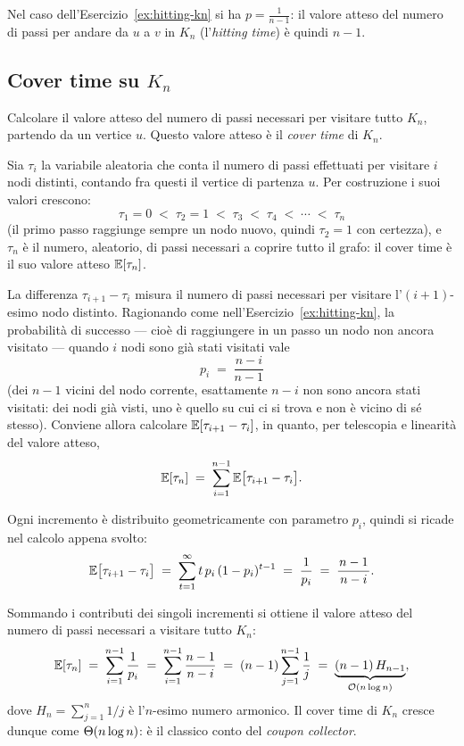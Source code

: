 Nel caso dell'Esercizio~\ref{ex:hitting-kn} si ha $p=\frac{1}{n-1}$: il valore atteso del numero di
passi per andare da $u$ a $v$ in $K_n$ (l'\emph{hitting time}) è quindi $n-1$.

\subsection{Cover time su \texorpdfstring{$K_n$}{Kn}}

\begin{esercizio}\label{ex:cover-kn}
Calcolare il valore atteso del numero di passi necessari per visitare tutto $K_n$, partendo da
un vertice $u$. Questo valore atteso è il \emph{cover time} di $K_n$.
\end{esercizio}

Sia $\tau_i$ la variabile aleatoria che conta il numero di passi effettuati per visitare $i$
nodi distinti, contando fra questi il vertice di partenza $u$. Per costruzione i suoi valori
crescono:
\[
  \tau_1 = 0 \;<\; \tau_2 = 1 \;<\; \tau_3 \;<\; \tau_4 \;<\; \cdots \;<\; \tau_n
\]
(il primo passo raggiunge sempre un nodo nuovo, quindi $\tau_2 = 1$ con certezza), e
$\tau_n$ è il numero, aleatorio, di passi necessari a coprire tutto il grafo: il cover time è
il suo valore atteso $\mathbb{E}[\tau_n]$.

La differenza $\tau_{i+1}-\tau_i$ misura il numero di passi necessari per visitare
l'$(i+1)$-esimo nodo distinto. Ragionando come nell'Esercizio~\ref{ex:hitting-kn}, la probabilità di
successo --- cioè di raggiungere in un passo un nodo non ancora visitato --- quando $i$ nodi
sono già stati visitati vale
\[
  p_i \;=\; \frac{n-i}{n-1}
\]
(dei $n-1$ vicini del nodo corrente, esattamente $n-i$ non sono ancora stati visitati: dei
nodi già visti, uno è quello su cui ci si trova e non è vicino di sé stesso). Conviene allora
calcolare $\mathbb{E}[\tau_{i+1}-\tau_i]$, in quanto, per telescopia e linearità del valore atteso,
\[
  \mathbb{E}[\tau_n] \;=\; \sum_{i=1}^{n-1} \mathbb{E}\bigl[\tau_{i+1}-\tau_i\bigr] .
\]

Ogni incremento è distribuito geometricamente con parametro $p_i$, quindi si ricade nel
calcolo appena svolto:
\[
  \mathbb{E}\bigl[\tau_{i+1}-\tau_i\bigr] \;=\; \sum_{t=1}^{\infty} t\,p_i\,(1-p_i)^{t-1}
  \;=\; \frac{1}{p_i} \;=\; \frac{n-1}{\,n-i\,} .
\]

Sommando i contributi dei singoli incrementi si ottiene il valore atteso del numero di passi
necessari a visitare tutto $K_n$:
\[
  \mathbb{E}[\tau_n] \;=\; \sum_{i=1}^{n-1} \frac{1}{p_i}
  \;=\; \sum_{i=1}^{n-1} \frac{n-1}{n-i}
  \;=\; (n-1) \sum_{j=1}^{n-1} \frac{1}{j}
  \;=\; \underbrace{(n-1)\,H_{n-1}}_{\mathcal{O}(n\log n)},
\]
dove $H_n = \sum_{j=1}^{n} 1/j$ è l'$n$-esimo numero armonico. Il cover time di $K_n$ cresce
dunque come $\Theta(n \log n)$: è il classico conto del \emph{coupon collector}.

